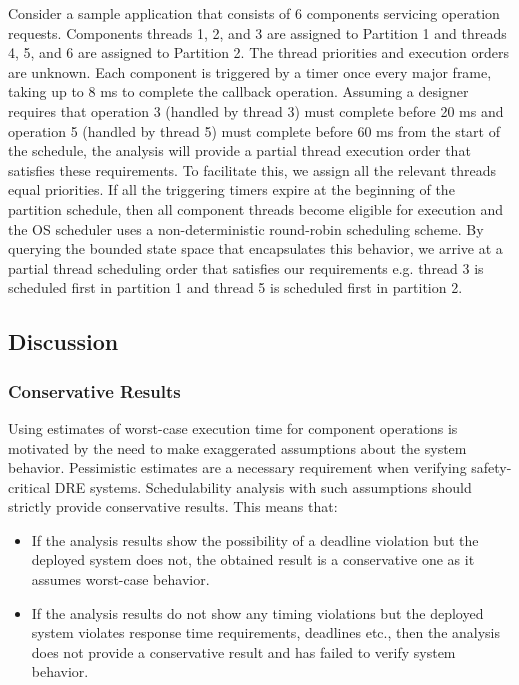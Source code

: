 Consider a sample application that consists of 6 components servicing operation requests. Components threads 1, 2, and 3 are assigned to Partition 1 and threads 4, 5, and 6 are assigned to Partition 2. The thread priorities and execution orders are unknown. Each component is triggered by a timer once every major frame, taking up to 8 ms to complete the callback operation. Assuming a designer requires that operation 3 (handled by thread 3) must complete before 20 ms and operation 5 (handled by thread 5) must complete before 60 ms from the start of the schedule, the analysis will provide a partial thread execution order that satisfies these requirements. To facilitate this, we assign all the relevant threads equal priorities. If all the triggering timers expire at the beginning of the partition schedule, then all component threads become eligible for execution and the OS scheduler uses a non-deterministic round-robin scheduling scheme. By querying the bounded state space that encapsulates this behavior, we arrive at a partial thread scheduling order that satisfies our requirements e.g. thread 3 is scheduled first in partition 1 and thread 5 is scheduled first in partition 2.

\subsection{Discussion}

\subsubsection{Conservative Results}

Using estimates of worst-case execution time for component operations is motivated by the need to make exaggerated assumptions about the system behavior. Pessimistic estimates are a necessary requirement when verifying safety-critical DRE systems. Schedulability analysis with such assumptions should strictly provide conservative results. This means that:

\begin{itemize}
	\item If the analysis results show the possibility of a deadline violation but the deployed system does not, the obtained result is a conservative one as it assumes worst-case behavior. 
	
	\item If the analysis results do not show any timing violations but the deployed system violates response time requirements, deadlines etc., then the analysis does not provide a conservative result and has failed to verify system behavior.
\end{itemize}

